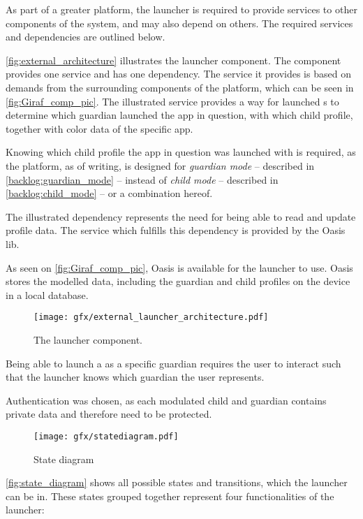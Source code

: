 \label{design:overview}
\label{sec:design_overview}
As part of a greater platform, the launcher is required to provide services to other components of the \giraf[] system, and may also depend on others.
The required services and dependencies are outlined below.

\autoref{fig:external_architecture} illustrates the \giraf[] launcher component. The component provides one service and has one dependency.
The service it provides is based on demands from the surrounding components of the \giraf[] platform, which can be seen in \autoref{fig:Giraf_comp_pic}.
The illustrated service provides a way for launched \girafapp[]s to determine which guardian launched the app in question, with which child profile, together with color data of the specific app.

Knowing which child profile the app in question was launched with is required, as the \giraf[] platform, as of writing, is designed for \emph{guardian mode} -- described in \autoref{backlog:guardian_mode} -- instead of \emph{child mode} -- described in \autoref{backlog:child_mode} -- or a combination hereof.

The illustrated dependency represents the need for being able to read and update profile data. The service which fulfills this dependency is provided by the Oasis lib. 

As seen on \autoref{fig:Giraf_comp_pic}, Oasis is available for the launcher to use. Oasis stores the modelled data, including the guardian and child profiles on the device in a local database.


\begin{figure}[h]
	\centering
	\texttt{[image: gfx/external\_launcher\_architecture.pdf]}
	\caption{The \giraf[] launcher component.}
	\label{fig:external_architecture}
\end{figure}

Being able to launch a \girafapp[] as a specific guardian requires the user to interact such that the launcher knows which guardian the user represents.

Authentication was chosen, as each modulated child and guardian contains private data and therefore need to be protected.

\begin{figure}[h]
	\centering
	\texttt{[image: gfx/statediagram.pdf]}
	\caption{State diagram}
	\label{fig:state_diagram}
\end{figure}


\autoref{fig:state_diagram} shows all possible states and transitions, which the launcher can be in. 
These states grouped together represent four functionalities of the launcher:

